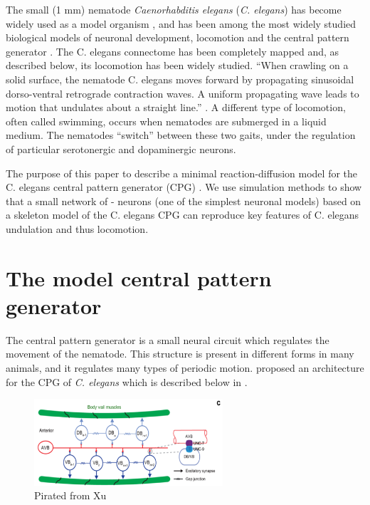 \documentclass[
    11pt,
]{article}
\begin{document}
The small (1 mm) nematode \emph{Caenorhabditis elegans} (\emph{C. elegans}) has become widely used as a model organism \citep{corsi2015}, and has been among the most widely studied biological models of neuronal development, locomotion and the central pattern generator \citep{katz2016}.
The C. elegans connectome has been completely mapped \citep{jabr} and, as described below, its locomotion has been widely studied.
``When crawling on a solid surface, the nematode C. elegans moves forward by propagating sinusoidal dorso-ventral retrograde contraction waves. A uniform propagating wave leads to motion that undulates about a straight line.'' \citep{kim2011}.
A different type of locomotion, often called swimming, occurs when nematodes are submerged in a liquid medium. The nematodes “switch” between these two gaits, under the regulation of particular serotonergic and dopaminergic neurons.

The purpose of this paper to describe a minimal reaction-diffusion model for the C. elegans central pattern generator (CPG) \citep{xu2018, wen2012}. We use simulation methods to show that a small network of \cite{fitzhugh1955}-\cite{nagumo1962} neurons (one of the simplest neuronal models) based on a skeleton model of the C. elegans CPG can reproduce key features of C. elegans undulation \citep{magnes2012} and thus locomotion.

\section{The model central pattern generator}

The central pattern generator is a small neural circuit which regulates the movement of the nematode.  This structure is present in different forms in many animals, and it regulates many types of periodic motion.  \citet{xu2018} proposed an architecture for the CPG of \emph{C. elegans} which is described below in .

\begin{figure}[h!]
    \label{fig: xu_cpg}
    \centering
    \includegraphics[width=7cm]{figures/xu_cpg/xu_cpg.png}
    \caption{Pirated from Xu}
\end{figure}
\end{document}
